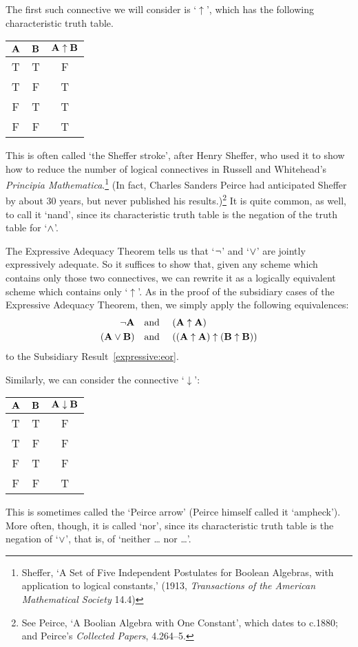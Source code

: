 The first such connective we will consider is `$\uparrow$', which has the following characteristic truth table. 
\begin{center}
\begin{tabular}{c c | c}
$\mathbf{A}$ & $\mathbf{B}$ & $\mathbf{A} \mathrel{\uparrow} \mathbf{B}$\\
\hline
 T & T & F \\
 T & F & T \\
 F & T & T  \\
 F & F & T
\end{tabular}
\end{center}
 This is often called `the Sheffer stroke', after Henry Sheffer, who used it to show how to reduce the number of logical connectives in Russell and Whitehead's \emph{Principia Mathematica}.\footnote{Sheffer, `A Set of Five Independent Postulates for Boolean Algebras, with application to logical constants,' (1913, \emph{Transactions of the American Mathematical Society} 14.4)} (In fact, Charles Sanders Peirce had anticipated Sheffer by about 30 years, but never published his results.)\footnote{See Peirce, `A Boolian Algebra with One Constant', which dates to c.1880; and Peirce's \emph{Collected Papers}, 4.264--5.} It is quite common, as well, to call it `nand', since its characteristic truth table is the negation of the truth table for `$\wedge$'.

The Expressive Adequacy Theorem tells us that `$\neg$' and `$\vee$' are jointly expressively adequate. So it suffices to show that, given any scheme which contains only those two connectives, we can rewrite it as a logically equivalent scheme which contains only `$\uparrow$'. As in the proof of the subsidiary cases of the Expressive Adequacy Theorem, then, we simply apply the following equivalences:
		\begin{align*}
			\neg \mathbf{A} &\text{\quad and \quad} (\mathbf{A} \uparrow \mathbf{A})\\
			(\mathbf{A} \vee \mathbf{B}) & \text{\quad and \quad} ((\mathbf{A} \uparrow \mathbf{A}) \uparrow (\mathbf{B} \uparrow \mathbf{B}))
		\end{align*}
to the Subsidiary Result~\ref{expressive:eor}.

Similarly, we can consider the connective `$\downarrow$':
\begin{center}
\begin{tabular}{c c | c}
$\mathbf{A}$ & $\mathbf{B}$ & $\mathbf{A} \mathrel{\downarrow} \mathbf{B}$\\
\hline
 T & T & F \\
 T & F & F  \\
 F & T & F  \\
 F & F & T
\end{tabular}
\end{center}
This is sometimes called the `Peirce arrow' (Peirce himself called it `ampheck'). More often, though, it is called `nor', since its characteristic truth table is the negation of `$\vee$', that is, of `neither \dots{} nor \dots'.

